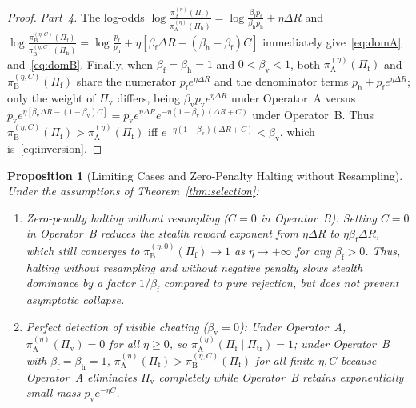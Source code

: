 \documentclass[11pt,a4paper]{article}
\newtheorem{proposition}[theorem]{Proposition}
\begin{document}
\begin{proof}
\emph{Part~4.} The log-odds $\log\frac{\pi_{\mathrm{A}}^{(\eta)}(\Pi_{\mathrm{f}})}{\pi_{\mathrm{A}}^{(\eta)}(\Pi_{\mathrm{h}})} = \log\frac{\beta_{\mathrm{f}} p_{\mathrm{f}}}{\beta_{\mathrm{h}} p_{\mathrm{h}}} + \eta\Delta R$ and $\log\frac{\pi_{\mathrm{B}}^{(\eta, C)}(\Pi_{\mathrm{f}})}{\pi_{\mathrm{B}}^{(\eta, C)}(\Pi_{\mathrm{h}})} = \log\frac{p_{\mathrm{f}}}{p_{\mathrm{h}}} + \eta[\beta_{\mathrm{f}}\Delta R - (\beta_{\mathrm{h}} - \beta_{\mathrm{f}})C]$ immediately give~\eqref{eq:domA} and~\eqref{eq:domB}. Finally, when $\beta_{\mathrm{f}} = \beta_{\mathrm{h}} = 1$ and $0 < \beta_{\mathrm{v}} < 1$, both $\pi_{\mathrm{A}}^{(\eta)}(\Pi_{\mathrm{f}})$ and $\pi_{\mathrm{B}}^{(\eta, C)}(\Pi_{\mathrm{f}})$ share the numerator $p_{\mathrm{f}} e^{\eta \Delta R}$ and the denominator terms $p_{\mathrm{h}} + p_{\mathrm{f}} e^{\eta \Delta R}$; only the weight of $\Pi_{\mathrm{v}}$ differs, being $\beta_{\mathrm{v}} p_{\mathrm{v}} e^{\eta \Delta R}$ under Operator~A versus $p_{\mathrm{v}} e^{\eta[\beta_{\mathrm{v}}\Delta R - (1-\beta_{\mathrm{v}})C]} = p_{\mathrm{v}} e^{\eta \Delta R} e^{-\eta(1-\beta_{\mathrm{v}})(\Delta R + C)}$ under Operator~B. Thus $\pi_{\mathrm{B}}^{(\eta, C)}(\Pi_{\mathrm{f}}) > \pi_{\mathrm{A}}^{(\eta)}(\Pi_{\mathrm{f}})$ iff $e^{-\eta(1-\beta_{\mathrm{v}})(\Delta R + C)} < \beta_{\mathrm{v}}$, which is~\eqref{eq:inversion}.
\end{proof}

\begin{proposition}[Limiting Cases and Zero-Penalty Halting without Resampling]\label{prop:limits}
Under the assumptions of Theorem~\ref{thm:selection}:
\begin{enumerate}
  \item \emph{Zero-penalty halting without resampling ($C = 0$ in Operator~B):} Setting $C = 0$ in Operator~B reduces the stealth reward exponent from $\eta\Delta R$ to $\eta\beta_{\mathrm{f}}\Delta R$, which still converges to $\pi_{\mathrm{B}}^{(\eta, 0)}(\Pi_{\mathrm{f}}) \to 1$ as $\eta \to +\infty$ for any $\beta_{\mathrm{f}} > 0$. Thus, halting without resampling and without negative penalty slows stealth dominance by a factor $1/\beta_{\mathrm{f}}$ compared to pure rejection, but does not prevent asymptotic collapse.
  \item \emph{Perfect detection of visible cheating ($\beta_{\mathrm{v}} = 0$):} Under Operator~A, $\pi_{\mathrm{A}}^{(\eta)}(\Pi_{\mathrm{v}}) = 0$ for all $\eta \ge 0$, so $\pi_{\mathrm{A}}^{(\eta)}(\Pi_{\mathrm{f}} \mid \Pi_{\mathrm{tr}}) = 1$; under Operator~B with $\beta_{\mathrm{f}} = \beta_{\mathrm{h}} = 1$, $\pi_{\mathrm{A}}^{(\eta)}(\Pi_{\mathrm{f}}) > \pi_{\mathrm{B}}^{(\eta, C)}(\Pi_{\mathrm{f}})$ for all finite $\eta, C$ because Operator~A eliminates $\Pi_{\mathrm{v}}$ completely while Operator~B retains exponentially small mass $p_{\mathrm{v}} e^{-\eta C}$.
\end{enumerate}
\end{proposition}
\end{document}
